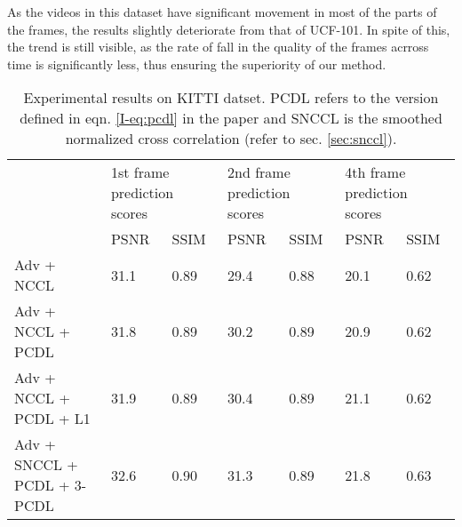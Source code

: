 \documentclass{article}
\begin{document}
  As the videos in this dataset have significant movement in most of the parts of the frames, the results slightly deteriorate from that of UCF-101. In spite of this, the trend is still visible, as the rate of fall in the quality of the frames acrross time is significantly less, thus ensuring the superiority of our method. 
  \begin{table}[!htbp]
  	\label{tab:sup_kitti}
  	\caption{Experimental results on KITTI datset. PCDL refers to the version defined in eqn. \ref{I-eq:pcdl} in the paper and SNCCL is the smoothed normalized cross correlation (refer to sec. \ref{sec:snccl}).}
  	\begin{tabular}{p{4cm}p{1.2cm}p{1.2cm}p{1.1cm}p{1.1cm}p{1.2cm}p{1.2cm}}
  		\hline
  		\multirow{2}{*}{} &
  		\multicolumn{2}{p{2.5cm}}{1st frame prediction scores} &
  		\multicolumn{2}{p{2.5cm}}{2nd frame prediction scores} &
  		\multicolumn{2}{p{2.5cm}}{4th frame prediction scores} \\
  		Methods & PSNR & SSIM & PSNR & SSIM & PSNR & SSIM \\
  		\hline
  		Adv + NCCL & 31.1 & 0.89 & 29.4 & 0.88 & 20.1 & 0.62 \\
  		\hline
  		Adv + NCCL + PCDL & 31.8 & 0.89 & 30.2 & 0.89 & 20.9 & 0.62 \\
  		\hline
  		Adv + NCCL + PCDL + L1 & 31.9 & 0.89 & 30.4 & 0.89 & 21.1 & 0.62 \\
  		\hline
  		Adv + SNCCL + PCDL + 3-PCDL & 32.6 & 0.90 & 31.3 & 0.89 & 21.8 & 0.63 \\
  		\hline
  		\end{tabular}
  \end{table}
\end{document}
